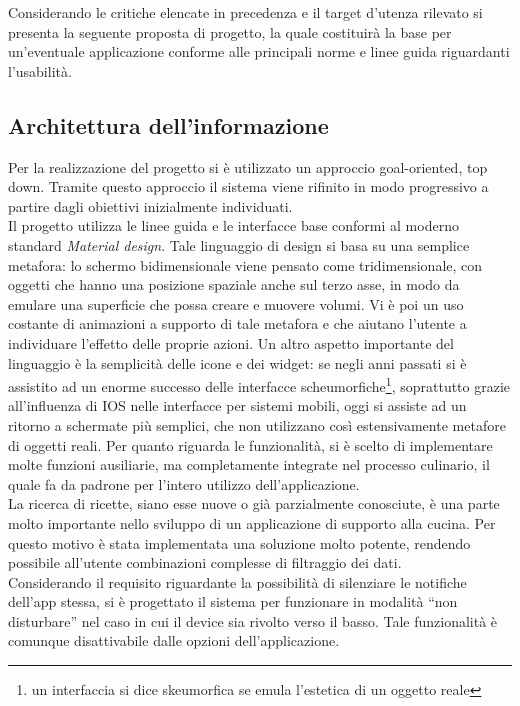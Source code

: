 Considerando le critiche elencate in precedenza e il target d'utenza rilevato si
presenta la seguente proposta di progetto, la quale costituirà la base per
un'eventuale applicazione conforme alle principali norme e linee guida
riguardanti l'usabilità.

\subsection{Architettura dell'informazione}
Per la realizzazione del progetto si è utilizzato un approccio goal-oriented, top down.
Tramite questo approccio il sistema viene rifinito in modo progressivo a partire dagli
obiettivi inizialmente individuati.\\
Il progetto utilizza le linee guida e le interfacce base conformi al moderno
standard \emph{Material design}\cite{MaterialDesign}. Tale linguaggio di design si basa su una semplice
metafora: lo schermo bidimensionale viene pensato come tridimensionale, con oggetti
che hanno una posizione spaziale anche sul terzo asse, in modo da emulare una superficie
che possa creare e muovere volumi. Vi è poi un uso costante di animazioni a supporto di tale metafora e che
aiutano l'utente a individuare l'effetto delle proprie azioni.
Un altro aspetto importante del linguaggio è la semplicità
delle icone e dei widget: se negli anni passati si è assistito ad un enorme
successo delle interfacce
scheumorfiche\footnote{un interfaccia si dice skeumorfica se emula l'estetica di un oggetto reale},
soprattutto grazie all'influenza di IOS nelle interfacce per sistemi mobili,
oggi si assiste ad un ritorno a schermate più semplici, che non utilizzano
così estensivamente metafore di oggetti reali.
Per quanto riguarda le funzionalità, si è scelto di implementare
molte funzioni ausiliarie, ma completamente integrate nel processo
culinario, il quale fa da padrone per l'intero utilizzo dell'applicazione.\\
La ricerca di ricette, siano esse nuove o già parzialmente conosciute, è una
parte molto importante nello sviluppo di un applicazione di supporto alla
cucina. Per questo motivo è stata implementata una soluzione molto potente, rendendo
possibile all'utente combinazioni complesse di filtraggio dei dati.\\
Considerando il requisito riguardante la possibilità di silenziare le notifiche
dell'app stessa, si è progettato il sistema per funzionare in modalità ``non
disturbare''
nel caso in cui il device sia rivolto verso il basso.  Tale funzionalità è
comunque disattivabile dalle opzioni dell'applicazione.

